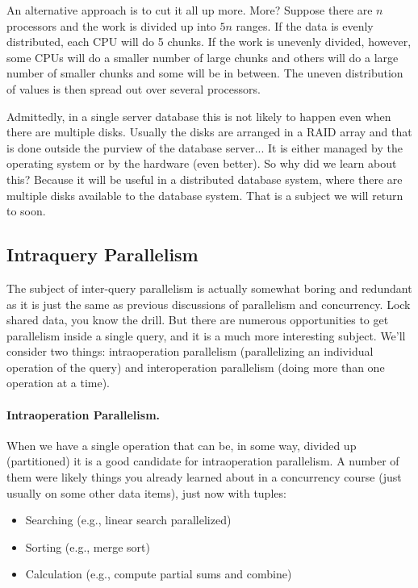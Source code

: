\documentclass[a4paper]{report}
\begin{document}
An alternative approach is to cut it all up more. More? Suppose there are $n$ processors and the work is divided up into $5n$ ranges. If the data is evenly distributed, each CPU will do 5 chunks. If the work is unevenly divided, however, some CPUs will do a smaller number of large chunks and others will do a large number of smaller chunks and some will be in between. The uneven distribution of values is then spread out over several processors. 

Admittedly, in a single server database this is not likely to happen even when there are multiple disks. Usually the disks are arranged in a RAID array and that is done outside the purview of the database server... It is either managed by the operating system or by the hardware (even better). So why did we learn about this? Because it will be useful in a distributed database system, where there are multiple disks available to the database system. That is a subject we will return to soon.

\subsection*{Intraquery Parallelism}

The subject of inter-query parallelism is actually somewhat boring and redundant as it is just the same as previous discussions of parallelism and concurrency. Lock shared data, you know the drill. But there are numerous opportunities to get parallelism inside a single query, and it is a much more interesting subject. We'll consider two things: intraoperation parallelism (parallelizing an individual operation of the query) and interoperation parallelism (doing more than one operation at a time). 

\paragraph{Intraoperation Parallelism.} 
When we have a single operation that can be, in some way, divided up (partitioned) it is a good candidate for intraoperation parallelism. A number of them were likely things you already learned about in a concurrency course (just usually on some other data items), just now with tuples:

\begin{itemize}
	\item Searching (e.g., linear search parallelized)
	\item Sorting (e.g., merge sort)
	\item Calculation (e.g., compute partial sums and combine)
\end{itemize}
\end{document}
